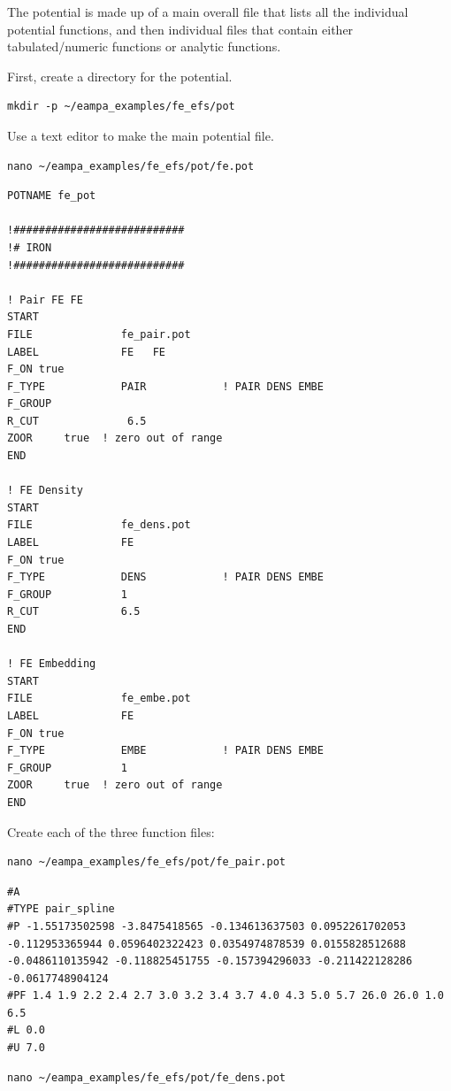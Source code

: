 \documentclass[12pt,twoside]{manual}
\begin{document}
The potential is made up of a main overall file that lists all the individual potential functions, and then individual files that contain either tabulated/numeric functions or analytic functions.

First, create a directory for the potential.

\begin{lstlisting}
mkdir -p ~/eampa_examples/fe_efs/pot
\end{lstlisting}

Use a text editor to make the main potential file.

\begin{lstlisting}
nano ~/eampa_examples/fe_efs/pot/fe.pot
\end{lstlisting}


\begin{lstlisting}
POTNAME fe_pot

!###########################
!# IRON
!###########################

! Pair FE FE
START
FILE              fe_pair.pot
LABEL             FE   FE
F_ON true
F_TYPE            PAIR            ! PAIR DENS EMBE
F_GROUP
R_CUT              6.5
ZOOR     true  ! zero out of range
END

! FE Density
START
FILE              fe_dens.pot
LABEL             FE
F_ON true
F_TYPE            DENS            ! PAIR DENS EMBE
F_GROUP           1
R_CUT             6.5
END

! FE Embedding
START
FILE              fe_embe.pot
LABEL             FE
F_ON true
F_TYPE            EMBE            ! PAIR DENS EMBE
F_GROUP           1
ZOOR     true  ! zero out of range
END
\end{lstlisting}


Create each of the three function files:

\begin{lstlisting}
nano ~/eampa_examples/fe_efs/pot/fe_pair.pot
\end{lstlisting}

\begin{lstlisting}
#A
#TYPE pair_spline
#P -1.55173502598 -3.8475418565 -0.134613637503 0.0952261702053 -0.112953365944 0.0596402322423 0.0354974878539 0.0155828512688 -0.0486110135942 -0.118825451755 -0.157394296033 -0.211422128286 -0.0617748904124
#PF 1.4 1.9 2.2 2.4 2.7 3.0 3.2 3.4 3.7 4.0 4.3 5.0 5.7 26.0 26.0 1.0 6.5
#L 0.0
#U 7.0
\end{lstlisting}

\begin{lstlisting}
nano ~/eampa_examples/fe_efs/pot/fe_dens.pot
\end{lstlisting}
\end{document}
